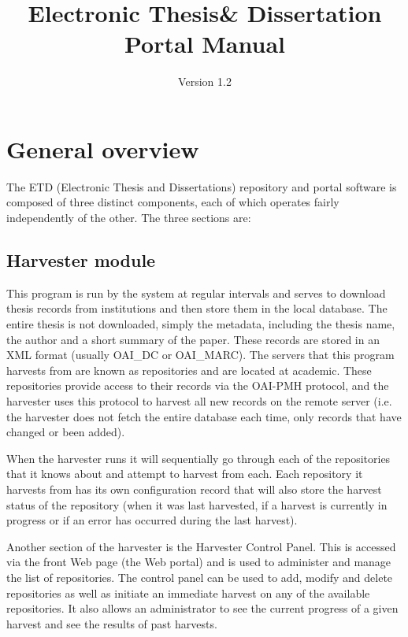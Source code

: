 \documentclass[a4paper,11pt]{article}
\title{Electronic Thesis\& Dissertation Portal Manual}
\author{Version 1.2}
\begin{document}
\maketitle
\thispagestyle{empty}
\newpage
\tableofcontents
\thispagestyle{empty}
\newpage

\section{General overview}

The ETD (Electronic Thesis and Dissertations) repository and portal software is composed of three distinct components, each of which operates fairly independently of the other. The three sections are:

\subsection{Harvester module}

This program is run by the system at regular intervals and serves to download thesis records from institutions and then store them in the local database. The entire thesis is not downloaded, simply the metadata, including the thesis name, the author and a short summary of the paper. These records are stored in an XML format (usually OAI\_DC or OAI\_MARC). The servers that this program harvests from are known as repositories and are located at academic. These repositories provide access to their records via the OAI-PMH protocol, and the harvester uses this protocol to harvest all new records on the remote server (i.e. the harvester does not fetch the entire database each time, only records that have changed or been added).

When the harvester runs it will sequentially go through each of the repositories that it knows about and attempt to harvest from each. Each repository it harvests from has its own configuration record that will also store the harvest status of the repository (when it was last harvested, if a harvest is currently in progress or if an error has occurred during the last harvest).

Another section of the harvester is the Harvester Control Panel. This is accessed via the front Web page (the Web portal) and is used to administer and manage the list of repositories. The control panel can be used to add, modify and delete repositories as well as initiate an immediate harvest on any of the available repositories. It also allows an administrator to see the current progress of a given harvest and see the results of past harvests.
\end{document}
